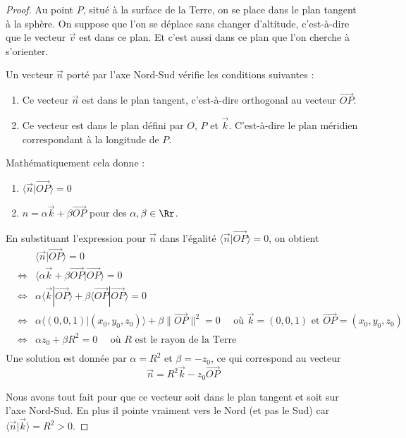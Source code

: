 \documentclass[class=report,crop=false]{standalone}
\newcommand{\vect}{\overrightarrow}
\begin{document}
\begin{proof}
Au point $P$, situé à la surface de la Terre, on se place dans le plan tangent 
à la sphère. On suppose %
que l'on se déplace sans changer d'altitude,
c'est-à-dire que le vecteur $\vect v$ est dans ce plan.
Et c'est aussi dans ce plan que l'on cherche à s'orienter.



Un vecteur $\vect n$ porté par l'axe Nord-Sud vérifie les conditions suivantes :
\begin{enumerate}
  \item Ce vecteur $\vect n$ est dans le plan tangent, 
  c'est-à-dire orthogonal au vecteur $\vect{OP}$.
  
  \item Ce vecteur est dans le plan défini par $O$, $P$ et $\vect k$.
  C'est-à-dire le plan méridien correspondant à la longitude de $P$.
\end{enumerate}

Mathématiquement cela donne :
\begin{enumerate}
  \item $\langle \vect n | \vect{OP} \rangle = 0$
  \item $n = \alpha \vect k + \beta\vect{OP}  $ pour des $\alpha,\beta \in \Rr$.
\end{enumerate}


En substituant l'expression pour $\vect n$ dans l'égalité $\langle \vect n | \vect{OP} \rangle = 0$,
on obtient
\begin{eqnarray*}
&&          \langle \vect n | \vect{OP} \rangle = 0   \\
&\iff& \langle \alpha \vect k + \beta\vect{OP} | \vect{OP} \rangle = 0 \\
&\iff&  \alpha \langle \vect k | \vect{OP} \rangle
+ \beta \langle \vect{OP} | \vect{OP} \rangle = 0 \\
&\iff&  \alpha\langle (0,0,1) | (x_0,y_0,z_0) \rangle  + \beta \|\vect{OP} \|^2 = 0 
\quad \text{ où } \vect k = (0,0,1) \text{ et } \vect{OP} = (x_0,y_0,z_0)\\
&\iff&  \alpha z_0 + \beta R^2  = 0 
\quad \text{ où } R \text{ est le rayon de la Terre} \\
\end{eqnarray*}
Une solution est donnée par $\alpha = R^2$ et $\beta = -z_0$, ce qui correspond au vecteur
$$\vect n = R^2 \vect{k} - z_0 \vect{OP}$$

Nous avons tout fait pour que ce vecteur soit dans le plan tangent et soit sur l'axe Nord-Sud.
En plus il pointe vraiment vers le Nord (et pas le Sud) car
$\langle \vect n | \vect k \rangle = R^2 > 0$.
\end{proof}
\end{document}
